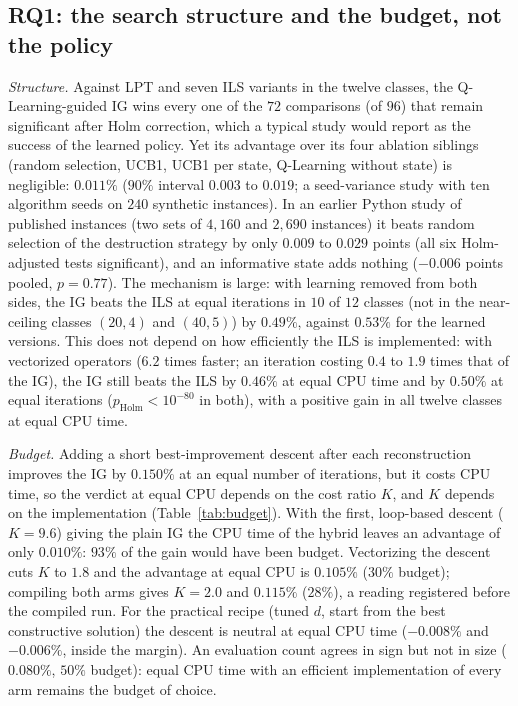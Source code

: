 \documentclass[conference,a4paper]{IEEEtran}
\begin{document}
\subsection{RQ1: the search structure and the budget, not the policy}
\label{sec:rq1}
\emph{Structure.} Against LPT and seven ILS variants in the twelve classes, the Q-Learning-guided IG wins every one of the $72$ comparisons (of $96$) that remain significant after Holm correction, which a typical study would report as the success of the learned policy. Yet its advantage over its four ablation siblings
(random selection, UCB1, UCB1 per state, Q-Learning without state) is negligible: $0.011\%$ ($90\%$ interval $0.003$ to $0.019$; a seed-variance study with ten algorithm seeds on $240$ synthetic instances). In an earlier Python study of published instances (two sets of $4{,}160$ and $2{,}690$ instances) it beats random selection of the destruction strategy by only $0.009$ to $0.029$ points (all six Holm-adjusted tests significant), and an informative state adds nothing
($-0.006$ points pooled, $p=0.77$). The mechanism is large: with learning removed from both sides, the IG beats the ILS at equal iterations in $10$ of $12$ classes (not in the near-ceiling classes $(20,4)$ and $(40,5)$) by $0.49\%$, against $0.53\%$ for the learned versions.
This does not depend on how efficiently the ILS is implemented: with vectorized operators ($6.2$ times faster; an iteration costing $0.4$ to $1.9$ times that of the IG), the IG still beats the ILS by $0.46\%$ at equal CPU time and by $0.50\%$ at equal iterations ($p_{\mathrm{Holm}}<10^{-80}$ in both), with a positive gain in all twelve classes at equal CPU time.

\emph{Budget.} Adding a short best-improvement descent after each reconstruction improves the IG by $0.150\%$ at an equal number of iterations, but it costs CPU time, so the verdict at equal CPU depends on the cost ratio $K$, and $K$ depends on the implementation (Table~\ref{tab:budget}).
With the first, loop-based descent ($K=9.6$) giving the plain IG the CPU time of the hybrid leaves an advantage of only $0.010\%$: $93\%$ of the gain would have been budget. Vectorizing the descent cuts $K$ to $1.8$ and the advantage at equal CPU is $0.105\%$
($30\%$ budget); compiling both arms gives $K=2.0$ and $0.115\%$ ($28\%$), a reading registered before the compiled run. For the practical recipe (tuned $d$, start from the best constructive solution) the descent is neutral at equal CPU time ($-0.008\%$ and $-0.006\%$, inside the margin). An evaluation count agrees in sign but not in size ($0.080\%$, $50\%$ budget): equal CPU time with an efficient implementation of every arm remains the budget of choice.
\end{document}
